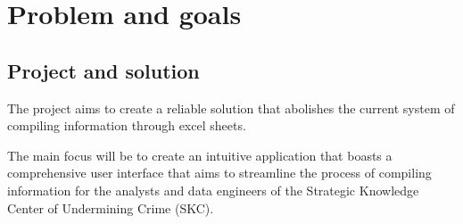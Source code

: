 \section{Problem and goals}
\label{sec:Problem-and-goals}

\subsection{Project and solution}
\label{subsec:Project-or-Solution}

The project aims to create a reliable solution that abolishes the current system of compiling information through excel sheets. 

The main focus will be to create an intuitive application that boasts a comprehensive user interface that aims to streamline the process of compiling information for the analysts and data engineers of the Strategic Knowledge Center of Undermining Crime (SKC).
